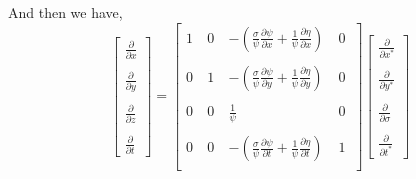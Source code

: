 \documentclass[oribibl]{llncs}
\begin{document}
And then we have,
\begin{equation}      
\left[                 
  \begin{array}{c}  
    \frac{\partial}{\partial x}  \\  \nonumber \\ 
    \frac{\partial}{\partial y}  \\ \nonumber \\ 
    \frac{\partial}{\partial z}  \\ \nonumber \\ 
    \frac{\partial}{\partial t} 
  \end{array}
\right]
=  
\left[             
  \begin{array}{cccc}  
   1\  & 0\ & -\left( \frac{\sigma}{\psi} \frac{\partial \psi}{\partial x} + \frac{1}{\psi}\frac{\partial \eta}{\partial x} \right)\ & 0\ \\   \nonumber \\ 
   0\  & 1\ & -\left(\frac{\sigma}{\psi} \frac{\partial \psi}{\partial y} + \frac{1}{\psi}\frac{\partial \eta}{\partial y} \right)\ & 0\ \\   \nonumber \\ 
   0\  & 0\ & \frac{1}{\psi} \													        & 0 \ \\   \nonumber \\ 
   0\  & 0\ & -\left(\frac{\sigma}{\psi} \frac{\partial \psi}{\partial t} + \frac{1}{\psi}\frac{\partial \eta}{\partial t} \right)\   & 1\ \\  
  \end{array}
\right]              
\left[                 
  \begin{array}{c}  
    \frac{\partial}{\partial x^*}  \\  \nonumber \\ 
    \frac{\partial}{\partial y^*}  \\ \nonumber \\ 
    \frac{\partial}{\partial \sigma}  \\ \nonumber \\ 
    \frac{\partial}{\partial t^*} 
  \end{array}
\right]
\end{equation}
\end{document}

